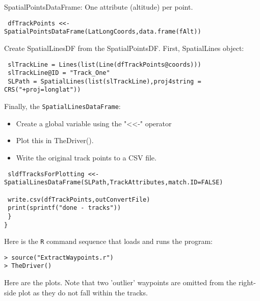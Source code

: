 \documentclass{beamer}
\begin{document}
\begin{frame}[fragile]
SpatialPointsDataFrame: 
One attribute (altitude) per point.

\begin{framed}
\begin{verbatim} 
 dfTrackPoints <<- SpatialPointsDataFrame(LatLongCoords,data.frame(fAlt))
\end{verbatim}
\end{framed}
\end{frame}
\begin{frame}[fragile]
Create SpatialLinesDF from the SpatialPointsDF.
 First, SpatialLines object:

\begin{framed}
\begin{verbatim}
 slTrackLine = Lines(list(Line(dfTrackPoints@coords)))
 slTrackLine@ID = "Track_One"
 SLPath = SpatialLines(list(slTrackLine),proj4string = CRS("+proj=longlat"))

\end{verbatim}
\end{framed}
\end{frame}

\begin{frame}

Finally, the \texttt{SpatialLinesDataFrame}:

\begin{itemize}
\item Create a global variable using the "<<-" operator
\item Plot this in TheDriver().
\item Write the original track points to a CSV file.
\end{itemize}
\end{frame}

\begin{frame}[fragile]
\begin{framed}
\begin{verbatim}
 sldfTracksForPlotting <<- SpatialLinesDataFrame(SLPath,TrackAttributes,match.ID=FALSE)

 write.csv(dfTrackPoints,outConvertFile)
 print(sprintf("done - tracks")) 
 }
}
\end{verbatim}
\end{framed}
\end{frame}

\begin{frame}[fragile]
Here is the \texttt{R} command sequence that loads and runs the program:

\begin{framed}
\begin{verbatim}
> source("ExtractWaypoints.r")
> TheDriver()
\end{verbatim}
\end{framed}
Here are the plots. Note that two 'outlier' waypoints are omitted from the right-side plot as they do not fall within the tracks.
\end{frame}
\end{document}
